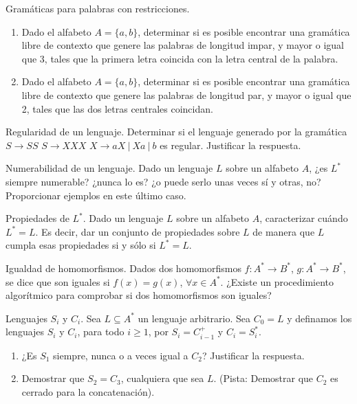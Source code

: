 \documentclass[12pt]{report} %
\begin{document}
\begin{ejercicio}
Gramáticas para palabras con restricciones.

\begin{enumerate}[label=\alph*)]
    \item Dado el alfabeto $A = \{a, b\}$, determinar si es posible encontrar una gramática libre de contexto que genere las palabras de longitud impar, y mayor o igual que 3, tales que la primera letra coincida con la letra central de la palabra.

    \item Dado el alfabeto $A = \{a, b\}$, determinar si es posible encontrar una gramática libre de contexto que genere las palabras de longitud par, y mayor o igual que 2, tales que las dos letras centrales coincidan.
\end{enumerate}

\end{ejercicio}

\begin{ejercicio}
Regularidad de un lenguaje.
Determinar si el lenguaje generado por la gramática  
$S \to SS$  
$S \to XXX$  
$X \to aX \ | \ Xa \ | \ b$  
es regular. Justificar la respuesta.
\end{ejercicio}

\begin{ejercicio}
Numerabilidad de un lenguaje.
Dado un lenguaje $L$ sobre un alfabeto $A$, ¿es $L^*$ siempre numerable? ¿nunca lo es? ¿o puede serlo unas veces sí y otras, no? Proporcionar ejemplos en este último caso.
\end{ejercicio}

\begin{ejercicio}
Propiedades de $L^*$. Dado un lenguaje $L$ sobre un alfabeto $A$, caracterizar cuándo $L^* = L$. Es decir, dar un conjunto de propiedades sobre $L$ de manera que $L$ cumpla esas propiedades si y sólo si $L^* = L$.
\end{ejercicio}

\begin{ejercicio}
Igualdad de homomorfismos. Dados dos homomorfismos $f : A^* \to B^*$, $g : A^* \to B^*$, se dice que son iguales si $f(x) = g(x)$, $\forall x \in A^*$. ¿Existe un procedimiento algorítmico para comprobar si dos homomorfismos son iguales?
\end{ejercicio}

\begin{ejercicio}
Lenguajes $S_i$ y $C_i$. 
Sea $L \subseteq A^*$ un lenguaje arbitrario. Sea $C_0 = L$ y definamos los lenguajes $S_i$ y $C_i$, para todo $i \geq 1$, por $S_i = C_{i-1}^+$ y $C_i = S_i^*$. 

\begin{enumerate}[label=\alph*)]
    \item ¿Es $S_1$ siempre, nunca o a veces igual a $C_2$? Justificar la respuesta.  

    \item Demostrar que $S_2 = C_3$, cualquiera que sea $L$. (Pista: Demostrar que $C_2$ es cerrado para la concatenación).
\end{enumerate}

\end{ejercicio}
\end{document}
